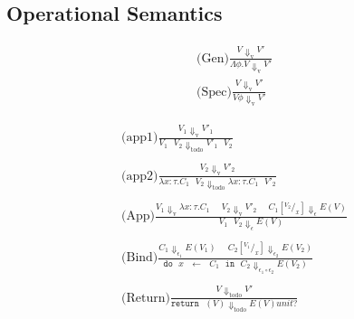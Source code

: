 \documentclass[twoside,a4paper,11pt]{article}
\newcommand{\s}{\mbox{ }}
\newcommand{\syntaxRule}[3]{\displaystyle\mbox{#1}\frac{#2}{#3}}
\newcommand{\doExpr}[3]{\texttt{do} \s #1\s \leftarrow \s #2 \s \texttt{in} \s #3}
\newcommand{\ret}[1]{\texttt{return} \s (#1)}
\newcommand{\ext}[1]{E(#1)}
\newcommand{\sub}[2]{\left[^{#1}/_{#2}\right]}
\newcommand{\goesTo}[3]{#1 \Downarrow_{\text{#3}} #2}
\begin{document}
\subsection{Operational Semantics}

\begin{equation}
\begin{array}{c}

\syntaxRule{(Gen)}{\goesTo{V}{V'}{v}}{\goesTo{\Lambda \phi. V}{V'}{v}}
 \\

\syntaxRule{(Spec)}{\goesTo{V}{V'}{v}}{\goesTo{V \phi}{V'}{v}}

\end{array}
\end{equation}

\begin{equation}
\begin{array}{c}

\syntaxRule{(app1)}{\goesTo{V_1}{V'_1}{v}}{\goesTo{V_1\s V_2}{V'_1\s V_2}{todo}}
 \\\\
 
 \syntaxRule{(app2)}{\goesTo{V_2}{V'_2}{v}}{\goesTo{\lambda x: \tau. C_1\s V_2}{\lambda x: \tau. C_1\s V'_2}{todo}}
 \\\\
 
 
\syntaxRule{(App)}
{\goesTo{V_1}{\lambda x: \tau. C_1}{v}\s\s \goesTo{V_2 }{V'_2}{v}\s\s \goesTo{C_1 \sub{V_2}{x}}{\ext{V}}{$\epsilon$}}{\goesTo{V_1\s V_2}{\ext{V}}{$\epsilon$}}
\\
\\

\syntaxRule{(Bind)}{\goesTo{C_1}{\ext{V_1}}{$\epsilon_1$}\s\s\goesTo{C_2\sub{V_1}{x}}{\ext{V_2}}{$\epsilon_2$}}{\goesTo{\doExpr{x}{C_1}{C_2}}{\ext{V_2}}{$\epsilon_1 \circ \epsilon_2$}}

\\\\

\syntaxRule{(Return)}{\goesTo{V}{V'}{todo}}{\goesTo{\ret{V}}{\ext{V}{unit?}}{todo}}
\end{array}
\end{equation}
\end{document}
